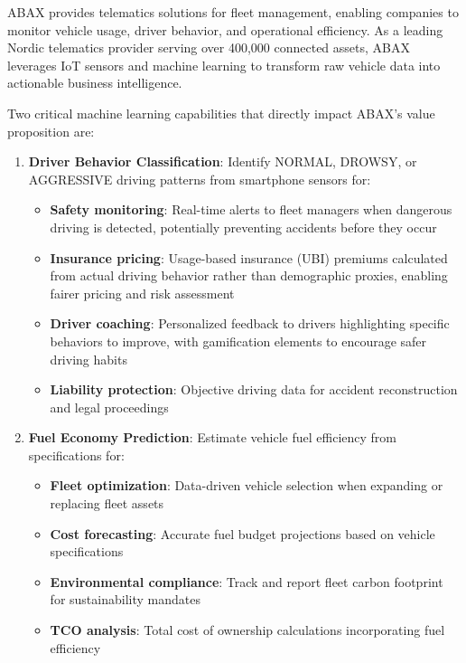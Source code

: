 \documentclass[11pt,a4paper]{article}
\begin{document}
ABAX provides telematics solutions for fleet management, enabling companies to monitor vehicle usage, driver behavior, and operational efficiency. As a leading Nordic telematics provider serving over 400,000 connected assets, ABAX leverages IoT sensors and machine learning to transform raw vehicle data into actionable business intelligence.

Two critical machine learning capabilities that directly impact ABAX's value proposition are:

\begin{enumerate}[leftmargin=*]
    \item \textbf{Driver Behavior Classification}: Identify NORMAL, DROWSY, or AGGRESSIVE driving patterns from smartphone sensors for:
    \begin{itemize}
        \item \textbf{Safety monitoring}: Real-time alerts to fleet managers when dangerous driving is detected, potentially preventing accidents before they occur
        \item \textbf{Insurance pricing}: Usage-based insurance (UBI) premiums calculated from actual driving behavior rather than demographic proxies, enabling fairer pricing and risk assessment
        \item \textbf{Driver coaching}: Personalized feedback to drivers highlighting specific behaviors to improve, with gamification elements to encourage safer driving habits
        \item \textbf{Liability protection}: Objective driving data for accident reconstruction and legal proceedings
    \end{itemize}

    \item \textbf{Fuel Economy Prediction}: Estimate vehicle fuel efficiency from specifications for:
    \begin{itemize}
        \item \textbf{Fleet optimization}: Data-driven vehicle selection when expanding or replacing fleet assets
        \item \textbf{Cost forecasting}: Accurate fuel budget projections based on vehicle specifications
        \item \textbf{Environmental compliance}: Track and report fleet carbon footprint for sustainability mandates
        \item \textbf{TCO analysis}: Total cost of ownership calculations incorporating fuel efficiency
    \end{itemize}
\end{enumerate}
\end{document}
